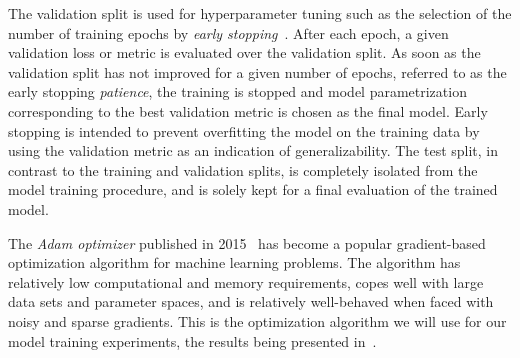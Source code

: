 The validation split is used for hyperparameter tuning such as the selection of the number of training epochs by \textit{early stopping}~\cite{early-stopping}.
After each epoch, a given validation loss or metric is evaluated over the validation split.
As soon as the validation split has not improved for a given number of epochs, referred to as the early stopping \textit{patience}, the training is stopped and model parametrization corresponding to the best validation metric is chosen as the final model.
Early stopping is intended to prevent overfitting the model on the training data by using the validation metric as an indication of generalizability.
The test split, in contrast to the training and validation splits, is completely isolated from the model training procedure, and is solely kept for a final evaluation of the trained model.

The \textit{Adam optimizer} published in 2015~\cite{adam-optimizer} has become a popular gradient-based optimization algorithm for machine learning problems.
The algorithm has relatively low computational and memory requirements, copes well with large data sets and parameter spaces, and is relatively well-behaved when faced with noisy and sparse gradients.
This is the optimization algorithm we will use for our model training experiments, the results being presented in~.

